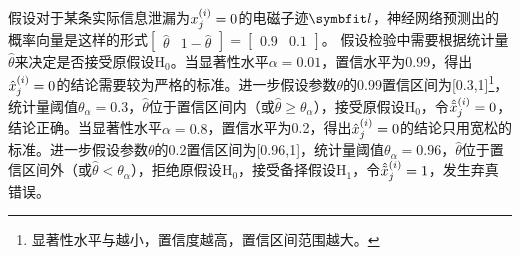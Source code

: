 {{	\begin{example}
		假设对于某条实际信息泄漏为$x^{(i)}_j=0$的电磁子迹$\Vector l$，神经网络预测出的概率向量是这样的形式$\begin{bmatrix}\hat\theta&1-\hat\theta\end{bmatrix}=\begin{bmatrix}0.9&0.1\end{bmatrix}$。%
		假设检验中需要根据统计量$\hat\theta$来决定是否接受原假设$\mathrm H_0$。当显著性水平$\alpha=0.01$，置信水平为0.99，得出$\hat{x}^{(i)}_j=0$的结论需要较为严格的标准。进一步假设参数$\theta$的0.99置信区间为[0.3,1]\footnote{显著性水平与越小，置信度越高，置信区间范围越大。}，统计量阈值$\theta_{\alpha}=0.3$，$\hat\theta$位于置信区间内（或$\hat\theta\ge\theta_{\alpha}$），接受原假设$\mathrm H_0$，令$\hat {\tilde{x}}^{(i)}_j=0$，结论正确。当显著性水平$\alpha=0.8$，置信水平为0.2，得出$\hat{x}^{(i)}_j=0$的结论只用宽松的标准。进一步假设参数$\theta$的0.2置信区间为[0.96,1]，统计量阈值$\theta_{\alpha}=0.96$，$\hat\theta$位于置信区间外（或$\hat\theta<\theta_{\alpha}$），拒绝原假设$\mathrm H_0$，接受备择假设$\mathrm H_1$，令$\hat {\tilde{x}}^{(i)}_j=1$，发生弃真错误。
	\end{example}
	


}}
